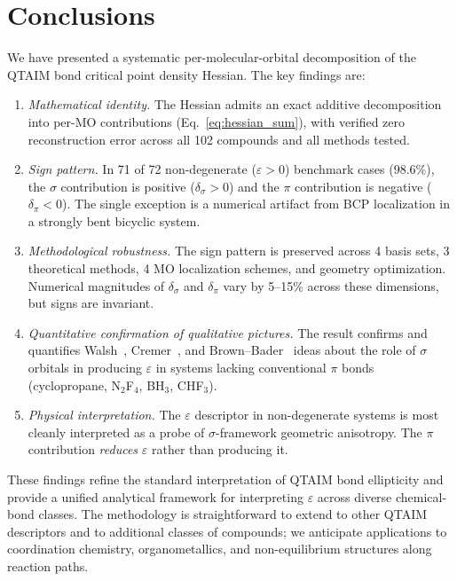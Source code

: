 \documentclass[twoside,natbib]{svjour3}
\newcommand{\delsg}{\delta_{\sigma}}
\newcommand{\delpi}{\delta_{\pi}}
\newcommand{\eps}{\varepsilon}
\begin{document}
\section{Conclusions}
\label{sec:conclusions}

We have presented a systematic per-molecular-orbital decomposition
of the QTAIM bond critical point density Hessian. The key findings are:

\begin{enumerate}
\item \emph{Mathematical identity.} The Hessian admits an exact
additive decomposition into per-MO contributions
(Eq.~\ref{eq:hessian_sum}), with verified zero reconstruction error
across all 102 compounds and all methods tested.
\item \emph{Sign pattern.} In 71 of 72 non-degenerate ($\eps > 0$)
benchmark cases (98.6\%), the $\sigma$ contribution is positive
($\delsg > 0$) and the $\pi$ contribution is negative ($\delpi < 0$).
The single exception is a numerical artifact from BCP localization
in a strongly bent bicyclic system.
\item \emph{Methodological robustness.} The sign pattern is preserved
across 4 basis sets, 3 theoretical methods, 4 MO localization
schemes, and geometry optimization. Numerical magnitudes of $\delsg$
and $\delpi$ vary by 5--15\% across these dimensions, but signs are
invariant.
\item \emph{Quantitative confirmation of qualitative pictures.} The
result confirms and quantifies Walsh~\citep{Walsh1947}, Cremer~\citep{Cremer1988},
and Brown--Bader~\citep{Brown2009} ideas about the role of $\sigma$
orbitals in producing $\eps$ in systems lacking conventional $\pi$
bonds (cyclopropane, N$_2$F$_4$, BH$_3$, CHF$_3$).
\item \emph{Physical interpretation.} The $\eps$ descriptor in
non-degenerate systems is most cleanly interpreted as a probe of
$\sigma$-framework geometric anisotropy. The $\pi$ contribution
\emph{reduces} $\eps$ rather than producing it.
\end{enumerate}

These findings refine the standard interpretation of QTAIM bond
ellipticity and provide a unified analytical framework for
interpreting $\eps$ across diverse chemical-bond classes. The
methodology is straightforward to extend to other QTAIM
descriptors and to additional classes of compounds; we anticipate
applications to coordination chemistry, organometallics, and
non-equilibrium structures along reaction paths.
\end{document}
